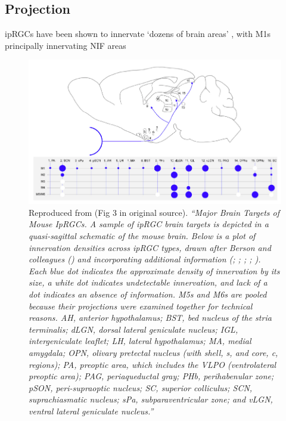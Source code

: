 \clearpage

\subsection{Projection}

\glspl{ipRGC} have been shown to innervate `dozens of brain areas' \citep{do_melanopsin_2019}, with M1s principally innervating \gls{NIF} areas

\begin{figure}[htbp]
\includegraphics[max width=\textwidth, center]{figs/LitRev/projection.png}
\caption{Reproduced from \citet{do_melanopsin_2019} (Fig 3 in original source). \textit{``Major Brain Targets of Mouse IpRGCs. A sample of ipRGC brain targets is depicted in a quasi-sagittal schematic of the mouse brain. Below is a plot of innervation densities across ipRGC types, drawn after Berson and colleagues (\citet{quattrochi_m6_2019}) and incorporating additional information (\citet{ecker_melanopsin-expressing_2010}; \citet{hattar_central_2006}; \citet{huang_visual_2019}; \citet{morin_retinofugal_2014}; \citet{zhao_photoresponse_2014}). Each blue dot indicates the approximate density of innervation by its size, a white dot indicates undetectable innervation, and lack of a dot indicates an absence of information. M5s and M6s are pooled because their projections were examined together for technical reasons. AH, anterior hypothalamus; BST, bed nucleus of the stria terminalis; dLGN, dorsal lateral geniculate nucleus; IGL, intergeniculate leaflet; LH, lateral hypothalamus; MA, medial amygdala; OPN, olivary pretectal nucleus (with shell, s, and core, c, regions); PA, preoptic area, which includes the VLPO (ventrolateral preoptic area); PAG, periaqueductal gray; PHb, perihabenular zone; pSON, peri-supraoptic nucleus; SC, superior colliculus; SCN, suprachiasmatic nucleus; sPa, subparaventricular zone; and vLGN, ventral lateral geniculate nucleus.''}}
\label{fig:projection}
\end{figure}

